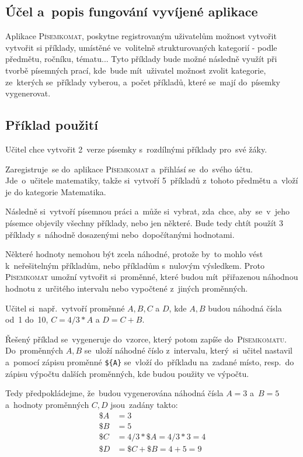 \documentclass[14pt,a4paper]{article}
\begin{document}
        \subsection{Účel a~popis fungování vyvíjené aplikace}
        Aplikace \textsc{Písemkomat}, poskytne registrovaným uživatelům možnost vytvořit vytvořit si příklady, umístěné ve~volitelně
        strukturovaných kategorií - podle předmětu, ročníku, tématu... Tyto příklady bude možné následně využít při tvorbě písemných prací,
        kde~bude mít~uživatel možnost zvolit kategorie, ze~kterých se~příklady vyberou, a~počet příkladů, které se~mají do~písemky vygenerovat. 
        \subsection{Příklad použití}
        Učitel chce vytvořit 2~verze písemky s~rozdílnými příklady pro~své žáky.
        
        Zaregistruje~se do~aplikace \textsc{Písemkomat} a~přihlásí se~do~svého účtu. Jde~o~učitele matematiky, takže si~vytvoří 5~příkladů z~tohoto předmětu a~vloží je do kategorie Matematika.

        Následně si~vytvoří písemnou práci a~může si~vybrat, zda~chce, aby~se~v~jeho písemce objevily všechny příklady, nebo jen některé. Bude tedy chtít použít 3\,příklady s~náhodně dosazenými nebo~dopočítanými hodnotami.
        
        Některé hodnoty nemohou být zcela náhodné, protože by~to mohlo vést k~neřešitelným příkladům, nebo příkladům s~nulovým výsledkem.
        Proto \textsc{Písemkomat} umožní vytvořit si~proměnné, které budou mít~přiřazenou náhodnou hodnotu z~určitého intervalu nebo vypočtené z~jiných proměnných.

        Učitel si~např.~vytvoří proměnné $A, B, C$ a $D$, kde $A, B$ budou náhodná čísla od~1 do~10, $C = 4/3*A$ a $D = C + B$.

        Řešený příklad se~vygeneruje do~vzorce, který potom zapíše do~\textsc{Písemkomatu}. Do~proměnných $A, B$ se~uloží náhodné číslo z~intervalu, který~si~učitel nastavil a~pomocí zápisu proměnné \texttt{\$\{A\}} se~vloží do~příkladu na~zadané místo, resp.~do zápisu výpočtu dalších proměnných, kde budou použity ve výpočtu.
        
        Tedy předpokládejme, že~budou vygenerována náhodná čísla $A = 3$ a~$B = 5$
        a~hodnoty proměnných $C, D$ jsou~zadány takto:
        \begin{align*}
            \$A &= 3 \\
            \$B &= 5 \\
            \$C &= 4/3*\$A = 4/3*3 = 4 \\
            \$D &= \$C + \$B = 4 + 5 = 9
        \end{align*}
\end{document}
